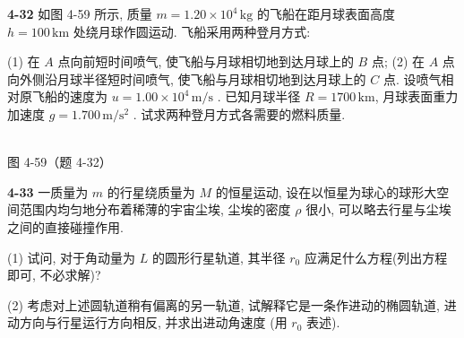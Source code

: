 \textbf{4-32} 如图 4-59 所示, 质量 $m=1.20 \times 10^{4}\,\mathrm{kg}$ 的飞船在距月球表面高度 $h=100\,\mathrm{km}$ 处绕月球作圆运动. 飞船采用两种登月方式:

(1) 在 $A$ 点向前短时间喷气, 使飞船与月球相切地到达月球上的 $B$ 点; (2) 在 $A$ 点向外侧沿月球半径短时间喷气, 使飞船与月球相切地到达月球上的 $C$ 点. 设喷气相对原飞船的速度为 $u = 1.00 \times 10^{4}\,\mathrm{m/s}$ . 已知月球半径 $R=1700\,\mathrm{km}$, 月球表面重力加速度 $g = 1.700\,\mathrm{m/s^{2}}$ . 试求两种登月方式各需要的燃料质量.

\begin{center}
\resizebox{0.50\textwidth}{!}{}\\[4pt]
{\small 图 4-59（题 4-32）}
\end{center}

\newpage

\textbf{4-33} 一质量为 $m$ 的行星绕质量为 $M$ 的恒星运动, 设在以恒星为球心的球形大空间范围内均匀地分布着稀薄的宇宙尘埃, 尘埃的密度 $\rho$ 很小, 可以略去行星与尘埃之间的直接碰撞作用.

(1) 试问, 对于角动量为 $L$ 的圆形行星轨道, 其半径 $r_{0}$ 应满足什么方程(列出方程即可, 不必求解)?

(2) 考虑对上述圆轨道稍有偏离的另一轨道, 试解释它是一条作进动的椭圆轨道, 进动方向与行星运行方向相反, 并求出进动角速度 (用 $r_0$ 表述).
